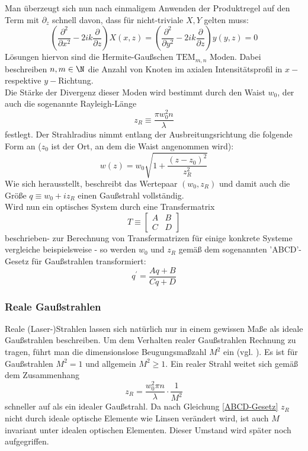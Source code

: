 \documentclass[11pt,a4paper,oneside]{scrartcl}
\begin{document}
Man überzeugt sich nun nach einmaligem Anwenden der Produktregel auf den Term mit $\partial_z$ schnell davon, dass für nicht-triviale $X,Y$ gelten muss:
\begin{equation}
\left(\frac{\partial^2}{\partial x^2}-2ik\frac{\partial}{\partial z}\right)X(x,z)=\left(\frac{\partial^2}{\partial y^2}-2ik\frac{\partial}{\partial z}\right)y(y,z)=0
\end{equation}
Lösungen hiervon sind die Hermite-Gaußschen $\mathrm{TEM}_{m,n}$ Moden. Dabei beschreiben $n,m\in\N$ die Anzahl von Knoten im axialen Intensitätsprofil in $x-$ respektive $y-$Richtung.\\
Die Stärke der Divergenz dieser Moden wird bestimmt durch den Waist $w_0$, der auch die sogenannte Rayleigh-Länge \begin{equation}\label{rayleigh} z_R\equiv \frac{\pi w_0^2n}{\lambda}\end{equation}festlegt. Der Strahlradius nimmt entlang der Ausbreitungsrichtung die folgende Form an ($z_0$ ist der Ort, an dem die Waist angenommen wird):
\begin{equation}
\label{transv_profil}
w(z)=w_0\sqrt{1+\frac{(z-z_0)^2}{z_R^2}}
\end{equation}
Wie sich herausstellt, beschreibt das Wertepaar $(w_0,z_R)$ und damit auch die Größe $q\equiv w_0+iz_R$ einen Gaußstrahl vollständig.\\
Wird nun ein optisches System durch eine Transfermatrix \begin{equation}
T\equiv\begin{bmatrix}
A& B\\
C & D
\end{bmatrix}
\end{equation}
beschrieben- zur Berechnung von Transfermatrizen für einige konkrete Systeme vergleiche beispielsweise \cite{demtröder_2}- so werden $w_0$ und $z_R$ gemäß dem sogenannten 'ABCD'-Gesetz für Gaußstrahlen transformiert:
\begin{equation}\label{ABCD-Gesetz}
q^\prime = \frac{Aq+B}{Cq+D}
\end{equation}
\subsubsection{Reale Gaußstrahlen}
Reale (Laser-)Strahlen lassen sich natürlich nur in einem gewissen Maße als ideale Gaußstrahlen beschreiben. Um dem Verhalten realer Gaußstrahlen Rechnung zu tragen, führt man die dimensionslose Beugungsmaßzahl $M^2$ ein (vgl. \cite{paschotta2016m2}). Es ist für Gaußstrahlen $M^2=1$ und allgemein $M^2\geq 1$. Ein realer Strahl weitet sich gemäß dem Zusammenhang
\begin{equation}\label{rayleigh_m2}
z_R=\frac{w_0^2\pi n}{\lambda}\cdot \frac1{M^2}
\end{equation}
schneller auf als ein idealer Gaußstrahl. Da nach Gleichung \ref{ABCD-Gesetz} $z_R$ nicht durch ideale optische Elemente wie Linsen verändert wird, ist auch $M$ invariant unter idealen optischen Elementen. Dieser Umstand wird später noch aufgegriffen.
\end{document}
